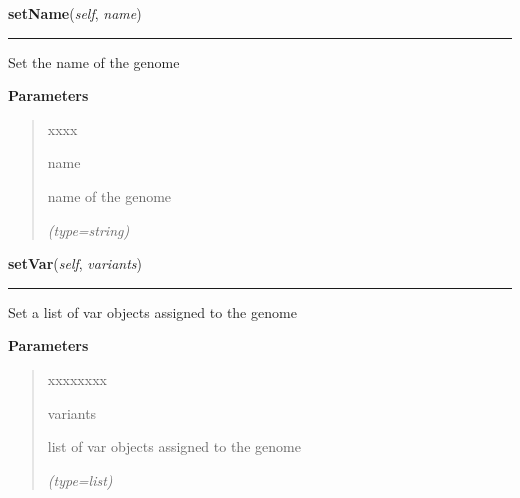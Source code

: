 \hspace{.8\funcindent}\begin{boxedminipage}{\funcwidth}

    \raggedright \textbf{setName}(\textit{self}, \textit{name})

    \vspace{-1.5ex}

    \rule{\textwidth}{0.5\fboxrule}
\setlength{\parskip}{2ex}
    Set the name of the genome

\setlength{\parskip}{1ex}
      \textbf{Parameters}
      \vspace{-1ex}

      \begin{quote}
        \begin{Ventry}{xxxx}

          \item[name]

          name of the genome

            {\it (type=string)}

        \end{Ventry}

      \end{quote}

    \end{boxedminipage}

    \label{script-FixedVar:genome:setVar}

    \vspace{0.5ex}

\hspace{.8\funcindent}\begin{boxedminipage}{\funcwidth}

    \raggedright \textbf{setVar}(\textit{self}, \textit{variants})

    \vspace{-1.5ex}

    \rule{\textwidth}{0.5\fboxrule}
\setlength{\parskip}{2ex}
    Set a list of var objects assigned to the genome

\setlength{\parskip}{1ex}
      \textbf{Parameters}
      \vspace{-1ex}

      \begin{quote}
        \begin{Ventry}{xxxxxxxx}

          \item[variants]

          list of var objects assigned to the genome

            {\it (type=list)}

        \end{Ventry}

      \end{quote}

    \end{boxedminipage}

